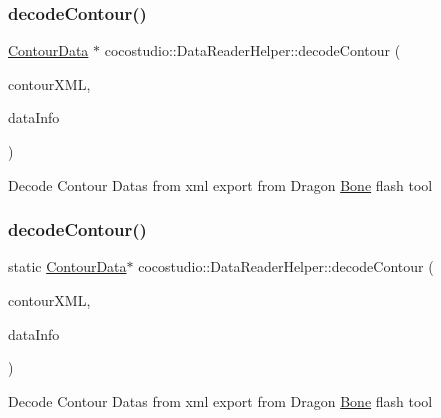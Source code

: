 \subsubsection{\texorpdfstring{decode\+Contour()}{decodeContour()}\hspace{0.1cm}{\footnotesize\ttfamily [1/2]}}
{\footnotesize\ttfamily \hyperlink{classcocostudio_1_1ContourData}{Contour\+Data} $\ast$ cocostudio\+::\+Data\+Reader\+Helper\+::decode\+Contour (\begin{DoxyParamCaption}\item[{\hyperlink{classtinyxml2_1_1XMLElement}{tinyxml2\+::\+X\+M\+L\+Element} $\ast$}]{contour\+X\+ML,  }\item[{\hyperlink{structcocostudio_1_1DataReaderHelper_1_1__DataInfo}{Data\+Info} $\ast$}]{data\+Info }\end{DoxyParamCaption})\hspace{0.3cm}{\ttfamily [static]}}

Decode Contour Datas from xml export from Dragon \hyperlink{classcocostudio_1_1Bone}{Bone} flash tool \mbox{\label{classcocostudio_1_1DataReaderHelper_ae8ab97715ed14e3cb645f5aaca70e916}} 
\subsubsection{\texorpdfstring{decode\+Contour()}{decodeContour()}\hspace{0.1cm}{\footnotesize\ttfamily [2/2]}}
{\footnotesize\ttfamily static \hyperlink{classcocostudio_1_1ContourData}{Contour\+Data}$\ast$ cocostudio\+::\+Data\+Reader\+Helper\+::decode\+Contour (\begin{DoxyParamCaption}\item[{\hyperlink{classtinyxml2_1_1XMLElement}{tinyxml2\+::\+X\+M\+L\+Element} $\ast$}]{contour\+X\+ML,  }\item[{\hyperlink{structcocostudio_1_1DataReaderHelper_1_1__DataInfo}{Data\+Info} $\ast$}]{data\+Info }\end{DoxyParamCaption})\hspace{0.3cm}{\ttfamily [static]}}

Decode Contour Datas from xml export from Dragon \hyperlink{classcocostudio_1_1Bone}{Bone} flash tool \mbox{\label{classcocostudio_1_1DataReaderHelper_a61dbb1c834a89dee7054fedd716f226c}} 
